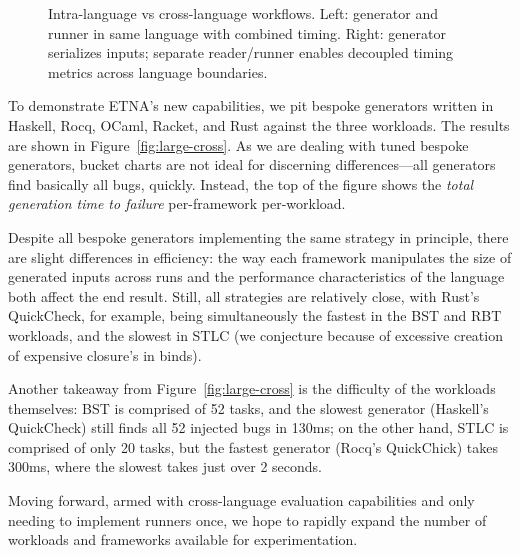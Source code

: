 \begin{figure}[H]
  \caption[Intra-language vs cross-language workflows]{Intra-language vs
    cross-language workflows. Left: generator and runner in same language with combined
    timing. Right: generator serializes inputs; separate reader/runner enables decoupled
    timing metrics across language boundaries.}
  \label{fig:workflow-comparison}
\end{figure}

To demonstrate ETNA's new capabilities, we pit bespoke generators written in Haskell,
Rocq, OCaml, Racket, and Rust against the three workloads. The results are shown in
Figure~\ref{fig:large-cross}. As we are dealing with tuned bespoke generators, bucket
charts are not ideal for discerning differences---all generators find basically all
bugs, quickly. Instead, the top of the figure shows the {\em total generation time to
    failure} per-framework per-workload.%

Despite all bespoke generators implementing the same strategy in principle, there are
slight differences in efficiency: the way each framework manipulates the size of
generated inputs across runs and the performance characteristics of the language both
affect the end result. Still, all strategies are relatively close, with Rust's
QuickCheck, for example, being simultaneously the fastest in the BST and RBT workloads,
and the slowest in STLC (we conjecture because of excessive creation of expensive
closure's in binds).

Another takeaway from Figure~\ref{fig:large-cross} is the difficulty of the workloads
themselves: BST is comprised of 52 tasks, and the slowest generator (Haskell's
QuickCheck) still finds all 52 injected bugs in 130ms; on the other hand, STLC is
comprised of only 20 tasks, but the fastest generator (Rocq's QuickChick) takes 300ms,
where the slowest takes just over 2 seconds.

Moving forward, armed with cross-language evaluation capabilities and only needing to
implement runners once, we hope to rapidly expand the number of workloads and
frameworks available for experimentation.


